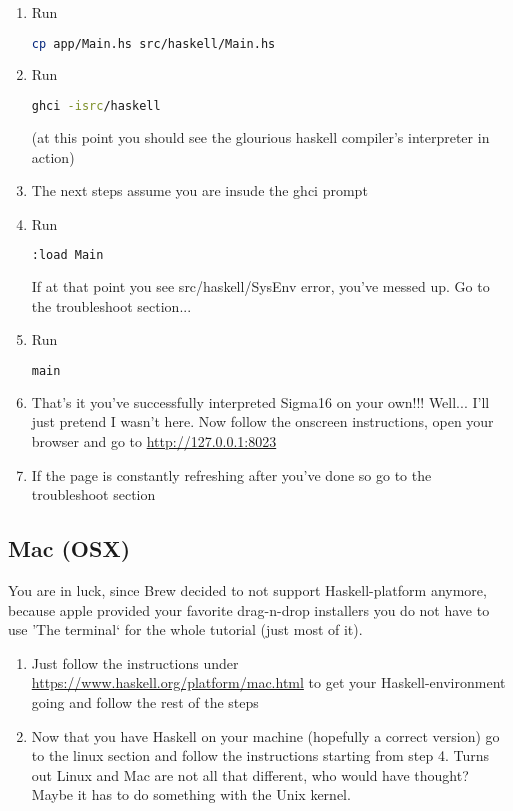 \documentclass[11pt,a4paper]{article}
\begin{document}
\begin{enumerate}
   \item Run
\begin{lstlisting}[language=Bash]
cp app/Main.hs src/haskell/Main.hs
\end{lstlisting}
   \item Run 
\begin{lstlisting}[language=Bash]
ghci -isrc/haskell
\end{lstlisting} (at this point you should see the glourious haskell compiler's interpreter in action)
   \item The next steps assume you are insude the ghci prompt
   \item Run 
\begin{lstlisting}[language=Bash]
:load Main
\end{lstlisting}
If at that point you see src/haskell/SysEnv error, you've messed up. Go to the troubleshoot section...
   \item Run 
\begin{lstlisting}[language=Bash]
main
\end{lstlisting}
   \item That's it you've successfully interpreted Sigma16 on your own!!! Well... I'll just pretend I wasn't here. Now follow the onscreen instructions, open your browser and go to \url{http://127.0.0.1:8023}
   \item If the page is constantly refreshing after you've done so go to the troubleshoot section

 \end{enumerate}

\subsection{Mac (OSX)}
You are in luck, since Brew decided to not support Haskell-platform anymore, because apple provided your favorite drag-n-drop installers you do not have to use 'The terminal` for the whole tutorial (just most of it).
\begin{enumerate}
    \item Just follow the instructions under \url{https://www.haskell.org/platform/mac.html} to get your Haskell-environment going and follow the rest of the steps
    \item Now that you have Haskell on your machine (hopefully a correct version) go to the linux section and follow the instructions starting from step 4. Turns out Linux and Mac are not all that different, who would have thought? Maybe it has to do something with the Unix kernel.
\end{enumerate}
\end{document}
